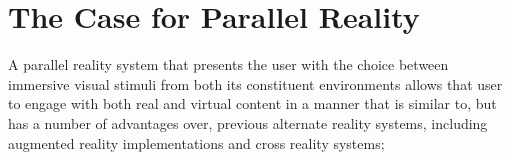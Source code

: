 







\section{The Case for Parallel Reality}
\label{caseforpr}

A parallel reality system that presents the user with the choice between immersive visual stimuli from both its constituent environments allows that user to engage with both real and virtual content in a manner that is similar to, but has a number of advantages over, previous alternate reality systems, including augmented reality implementations and cross reality systems;

